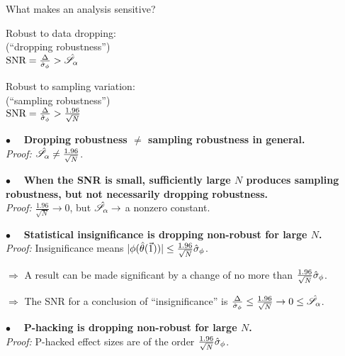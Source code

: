 \begin{frame}[t]{What makes an analysis sensitive?}
%
\begin{minipage}{0.45\textwidth}
\begin{center}
    Robust to data dropping:\\
    (``dropping robustness'')\\
    \vspace{1em}
    $\textrm{SNR} = \frac{\Delta}{\hat\sigma_{\phi}} > \hat{\mathscr{S}}_\alpha$
\end{center}
\end{minipage}
%
\begin{minipage}{0.45\textwidth}
\begin{center}
    Robust to sampling variation:\\
    (``sampling robustness'')\\
    \vspace{1em}
    $\textrm{SNR} = \frac{\Delta}{\hat\sigma_{\phi}} >
        \frac{1.96}{\sqrt{N}}$
\end{center}
\end{minipage}

\vspace{1em}

\hrulefill

\vspace{0.5em} $\bullet\quad$
\textbf{Dropping robustness $\ne$ sampling robustness in general.\\}
\textit{Proof: }
$\hat{\mathscr{S}}_\alpha \ne \frac{1.96}{\sqrt{N}}$.

\vspace{0.5em} $\bullet\quad$
\textbf{When the SNR is small, sufficiently large $N$
produces sampling robustness, but not necessarily
dropping robustness.\\}
\textit{Proof: }
$\frac{1.96}{\sqrt{N}} \rightarrow 0$, but $\hat{\mathscr{S}}_\alpha \rightarrow$ a nonzero
constant.

\vspace{0.5em} $\bullet\quad$
\textbf{Statistical insignificance is dropping non-robust for large $N$.\\}
\textit{Proof: }
%
Insignificance means
$|\phi(\hat{\theta}(\vec{1}))| \le \frac{1.96}{\sqrt{N}} \hat\sigma_{\phi}$.

$\Rightarrow$ A result can be made significant by a change of no more than
$\frac{1.96}{\sqrt{N}} \hat\sigma_{\phi}$.

$\Rightarrow$ The SNR for a conclusion
of ``insignificance'' is $\frac{\Delta}{\hat\sigma_{\phi}} \le \frac{1.96}{\sqrt{N}}
\rightarrow 0 \le \hat{\mathscr{S}}_\alpha$.

\vspace{0.5em} $\bullet\quad$
\textbf{P-hacking is dropping non-robust for large $N$.\\}
\textit{Proof: }P-hacked effect sizes are of the order
$\frac{1.96}{\sqrt{N}} \hat\sigma_{\phi}$.

\end{frame}



